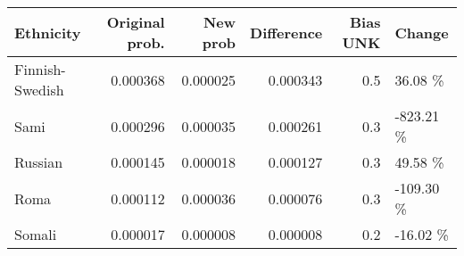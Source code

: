 \begin{tabular}{lrrrrl}
\toprule
      Ethnicity &  Original prob. &  New prob &  Difference &  Bias UNK &    Change \\
\midrule
Finnish-Swedish &        0.000368 &  0.000025 &    0.000343 &       0.5 &   36.08 \% \\
           Sami &        0.000296 &  0.000035 &    0.000261 &       0.3 & -823.21 \% \\
        Russian &        0.000145 &  0.000018 &    0.000127 &       0.3 &   49.58 \% \\
           Roma &        0.000112 &  0.000036 &    0.000076 &       0.3 & -109.30 \% \\
         Somali &        0.000017 &  0.000008 &    0.000008 &       0.2 &  -16.02 \% \\
\bottomrule
\end{tabular}
